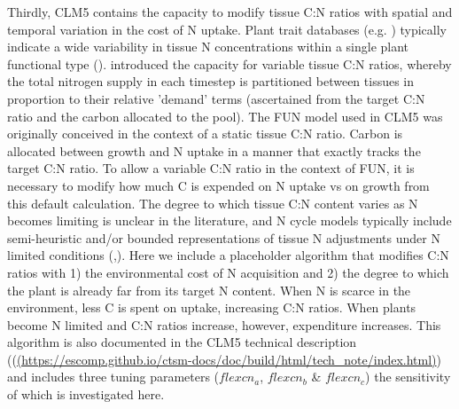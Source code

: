 \documentclass[draft,linenumbers]{agujournal}
\begin{document}
Thirdly, CLM5 contains the capacity to modify tissue C:N ratios with spatial and temporal variation in the cost of N uptake.  Plant trait databases (e.g. \cite{kattge2011}) typically indicate a wide variability in tissue N concentrations within a single plant functional type (\cite{wright2005}). \cite{ghimire2016} introduced the capacity for variable tissue C:N ratios, whereby the total nitrogen supply in each timestep is partitioned between tissues in proportion to their relative 'demand' terms (ascertained from the target C:N ratio and the carbon allocated to the pool).  The FUN model used in CLM5 was originally conceived in the context of a static tissue C:N ratio. Carbon is allocated between growth and N uptake in a manner that exactly tracks the target C:N ratio. To allow a variable C:N ratio in the context of FUN, it is necessary to modify how much C is expended on N uptake vs on growth from this default calculation. The degree to which tissue C:N content varies as N becomes limiting is unclear in the literature, and N cycle models typically include semi-heuristic and/or bounded representations of tissue N adjustments under N limited conditions (\cite{zaehle2010},\cite{ghimire2016}). Here we include a placeholder algorithm that modifies C:N ratios with 1) the environmental cost of N acquisition and 2) the degree to which the plant is already far from its target N content. When N is scarce in the environment, less C is spent on uptake, increasing C:N ratios. When plants become N limited and C:N ratios increase, however, expenditure increases. This algorithm is also documented in the CLM5 technical description ((\url{(https://escomp.github.io/ctsm-docs/doc/build/html/tech_note/index.html)}) and includes three tuning parameters ($flexcn_{a}$, $flexcn_{b}$ \& $flexcn_{c}$) the sensitivity of which is investigated here.
\end{document}
